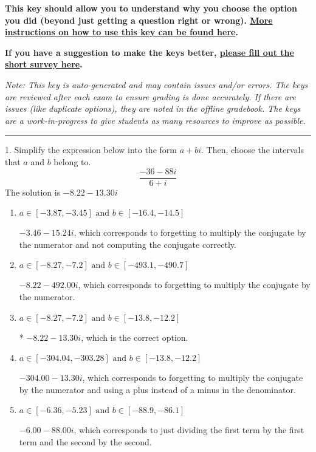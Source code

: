 \documentclass{extbook}[14pt]
\begin{document}
\textbf{This key should allow you to understand why you choose the option you did (beyond just getting a question right or wrong). \href{https://xronos.clas.ufl.edu/mac1105spring2020/courseDescriptionAndMisc/Exams/LearningFromResults}{More instructions on how to use this key can be found here}.}

\textbf{If you have a suggestion to make the keys better, \href{https://forms.gle/CZkbZmPbC9XALEE88}{please fill out the short survey here}.}

\textit{Note: This key is auto-generated and may contain issues and/or errors. The keys are reviewed after each exam to ensure grading is done accurately. If there are issues (like duplicate options), they are noted in the offline gradebook. The keys are a work-in-progress to give students as many resources to improve as possible.}

\rule{\textwidth}{0.4pt}

1. Simplify the expression below into the form $a+bi$. Then, choose the intervals that $a$ and $b$ belong to.
\[ \frac{-36 - 88 i}{6 + i} \] 
The solution is $ -8.22  - 13.30 i $ 

\begin{enumerate}[label=\Alph*.] 
\item $ a \in [-3.87, -3.45] \text{ and } b \in [-16.4, -14.5] $ 

  $-3.46  - 15.24 i$, which corresponds to forgetting to multiply the conjugate by the numerator and not computing the conjugate correctly. 
\item $ a \in [-8.27, -7.2] \text{ and } b \in [-493.1, -490.7] $ 

  $-8.22  - 492.00 i$, which corresponds to forgetting to multiply the conjugate by the numerator. 
\item $ a \in [-8.27, -7.2] \text{ and } b \in [-13.8, -12.2] $ 

 * $-8.22  - 13.30 i$, which is the correct option. 
\item $ a \in [-304.04, -303.28] \text{ and } b \in [-13.8, -12.2] $ 

  $-304.00  - 13.30 i$, which corresponds to forgetting to multiply the conjugate by the numerator and using a plus instead of a minus in the denominator. 
\item $ a \in [-6.36, -5.23] \text{ and } b \in [-88.9, -86.1] $ 

  $-6.00  - 88.00 i$, which corresponds to just dividing the first term by the first term and the second by the second. 
\end{enumerate} 
 
\end{document}
